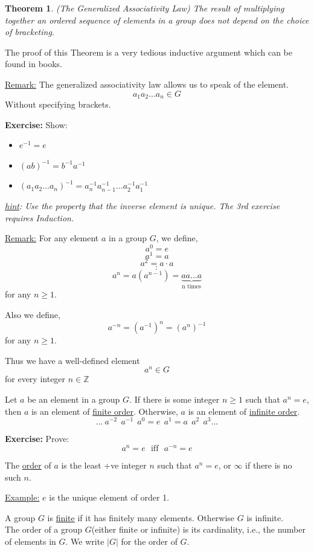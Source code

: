 \documentclass{article}
\newtheorem*{theorem}{Theorem}
\theoremstyle{definition}
\begin{document}
\begin{theorem}
    (The Generalized Associativity Law) The result of multiplying together an ordered sequence of elements in a group does not depend on the choice of bracketing.
\end{theorem}

The proof of this Theorem is a very tedious inductive argument which can be found in books.

\noindent \underline{Remark:} The generalized associativity law allows us to speak of the element.
$$a_1a_2...a_n\in G$$
Without specifying brackets.

\noindent\textbf{Exercise:}
Show:
\begin{itemize}
    \item $e^{-1}=e$
    \item $(ab)^{-1}=b^{-1}a^{-1}$
    \item $(a_1a_2...a_n)^{-1}=a_n^{-1}a_{n-1}^{-1}...a_2^{-1}a_1^{-1}$
\end{itemize}

\textit{\underline{hint}: Use the property that the inverse element is unique. The 3rd exercise requires Induction.}

\noindent\underline{Remark:} For any element $a$ in a group $G$, we define,
$$a^0=e$$
$$a^1=a$$
$$a^2=a\cdot a$$
$$:$$
$$a^n=a(a^{n-1})=\underbrace{aa...a}_{\text{n times}}$$ for any $n\ge1$.

Also we define,
$$a^{-n}=(a^{-1})^n=(a^n)^{-1}$$
for any $n\ge1$.

Thus we have a well-defined element $$a^n\in G$$ 
for every integer $n\in\mathbb{Z}$

\begin{tcolorbox} [title= Definition:, colback=black!10!white]
    Let $a$ be an element in a group $G$. If there is some integer $n\ge1$ such that $a^n=e$, then $a$ is an element of \underline{finite order}. Otherwise, $a$ is an element of \underline{infinite order}.
    $$...\ a^{-2}\ \ a^{-1}\ \ a^0=e\ \ a^1=a\ \ a^2\ \ a^3...$$
\end{tcolorbox}

\noindent\textbf{Exercise:} Prove: 
$$a^n=e \ \ \ \text{iff}\ \ \ a^{-n}=e$$

The \underline{order} of $a$ is the least +ve integer $n$ such that $a^n=e$, or $\infty$ if there is no such $n$.

\noindent\underline{Example:} $e$ is the unique element of order 1.

\begin{tcolorbox} [title= Definition:, colback=black!10!white]
    A group $G$ is \underline{finite} if it has finitely many elements. Otherwise $G$ is infinite. \\
    The order of a group $G$(either finite or infinite) is its cardinality, i.e., the number of elements in $G$. We write $|G|$ for the order of $G$.
\end{tcolorbox}
\end{document}
